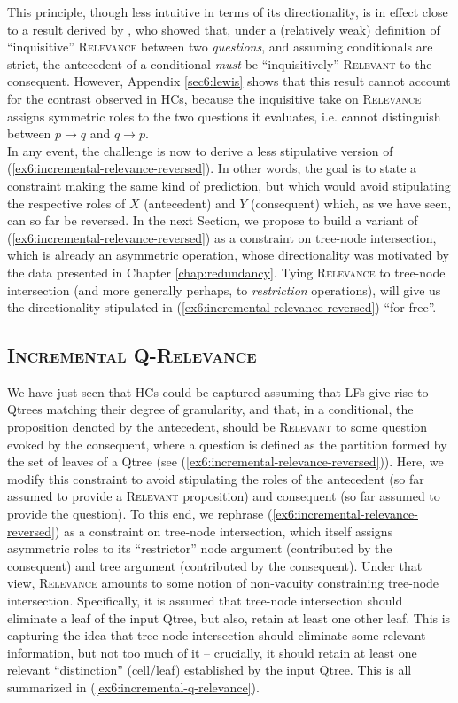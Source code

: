 This principle, though less intuitive in terms of its directionality, is in effect close to a result derived by \citet{Lewis1988}, who showed that, under a (relatively weak) definition of ``inquisitive'' \textsc{Relevance} between two \textit{questions}, and assuming conditionals are strict, the antecedent of a conditional \textit{must} be ``inquisitively'' \textsc{Relevant} to the consequent. However, Appendix \ref{sec6:lewis} shows that this result cannot account for the contrast observed in HCs, because the inquisitive take on \textsc{Relevance} assigns symmetric roles to the two questions it evaluates, i.e. cannot distinguish between $p \rightarrow q$ and $q \rightarrow p$.\\

In any event, the challenge is now to derive a less stipulative version of (\ref{ex6:incremental-relevance-reversed}). In other words, the goal is to state a constraint making the same kind of prediction, but which would avoid stipulating the respective roles of $X$ (antecedent) and $Y$ (consequent) which, as we have seen, can so far be reversed. In the next Section, we propose to build a variant of (\ref{ex6:incremental-relevance-reversed}) as a constraint on tree-node intersection, which is already an asymmetric operation, whose directionality was motivated by the data presented in Chapter \ref{chap:redundancy}. Tying \textsc{Relevance} to tree-node intersection (and more generally perhaps, to \textit{restriction} operations), will give us the directionality stipulated in (\ref{ex6:incremental-relevance-reversed}) ``for free''.

\subsection{\textsc{Incremental Q-Relevance}}

We have just seen that HCs could be captured assuming that LFs give rise to Qtrees matching their degree of granularity, and that, in a conditional, the proposition denoted by the antecedent, should be \textsc{Relevant} to some question evoked by the consequent, where a question is defined as the partition formed by the set of leaves of a Qtree (see (\ref{ex6:incremental-relevance-reversed})). Here, we modify this constraint to avoid stipulating the roles of the antecedent (so far assumed to provide a \textsc{Relevant} proposition) and consequent (so far assumed to provide the question). To this end, we rephrase (\ref{ex6:incremental-relevance-reversed}) as a constraint on tree-node intersection, which itself assigns asymmetric roles to its ``restrictor'' node argument (contributed by the consequent) and tree argument (contributed by the consequent). Under that view, \textsc{Relevance} amounts to some notion of non-vacuity constraining tree-node intersection. Specifically, it is assumed that tree-node intersection should eliminate a leaf of the input Qtree, but also, retain at least one other leaf. This is capturing the idea that tree-node intersection should eliminate some relevant information, but not too much of it -- crucially, it should retain at least one relevant ``distinction'' (cell/leaf) established by the input Qtree. This is all summarized in (\ref{ex6:incremental-q-relevance}).


